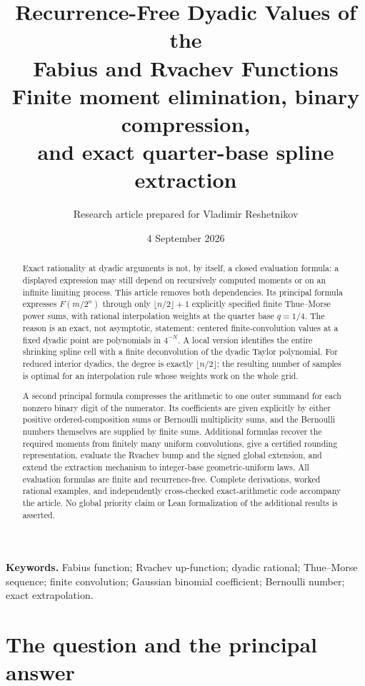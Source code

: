 \documentclass[11pt,a4paper]{article}
\title{\bfseries Recurrence-Free Dyadic Values of the\\Fabius and Rvachev Functions\\[0.6em]
\large Finite moment elimination, binary compression,\\and exact quarter-base spline extraction}
\author{Research article prepared for Vladimir Reshetnikov}
\date{4 September 2026}
\numberwithin{equation}{section}
\theoremstyle{definition}
\theoremstyle{remark}
\begin{document}
\maketitle
\begin{abstract}
Exact rationality at dyadic arguments is not, by itself, a closed evaluation formula: a displayed expression may still depend on recursively computed moments or on an infinite limiting process. This article removes both dependencies. Its principal formula expresses $F(m/2^n)$ through only $\lfloor n/2\rfloor+1$ explicitly specified finite Thue--Morse power sums, with rational interpolation weights at the quarter base $q=1/4$. The reason is an exact, not asymptotic, statement: centered finite-convolution values at a fixed dyadic point are polynomials in $4^{-N}$. A local version identifies the entire shrinking spline cell with a finite deconvolution of the dyadic Taylor polynomial. For reduced interior dyadics, the degree is exactly $\lfloor n/2\rfloor$; the resulting number of samples is optimal for an interpolation rule whose weights work on the whole grid.

A second principal formula compresses the arithmetic to one outer summand for each nonzero binary digit of the numerator. Its coefficients are given explicitly by either positive ordered-composition sums or Bernoulli multiplicity sums, and the Bernoulli numbers themselves are supplied by finite sums. Additional formulas recover the required moments from finitely many uniform convolutions, give a certified rounding representation, evaluate the Rvachev bump and the signed global extension, and extend the extraction mechanism to integer-base geometric-uniform laws. All evaluation formulas are finite and recurrence-free. Complete derivations, worked rational examples, and independently cross-checked exact-arithmetic code accompany the article. No global priority claim or Lean formalization of the additional results is asserted.
\end{abstract}
\vfill
\noindent\textbf{Keywords.} Fabius function; Rvachev up-function; dyadic rational; Thue--Morse sequence; finite convolution; Gaussian binomial coefficient; Bernoulli number; exact extrapolation.
\newpage
\begingroup
\fontsize{10}{11}\selectfont
\setlength{\parskip}{0pt}
\tableofcontents
\endgroup
\newpage

\section{The question and the principal answer}
\label{sec:answer}
\end{document}
